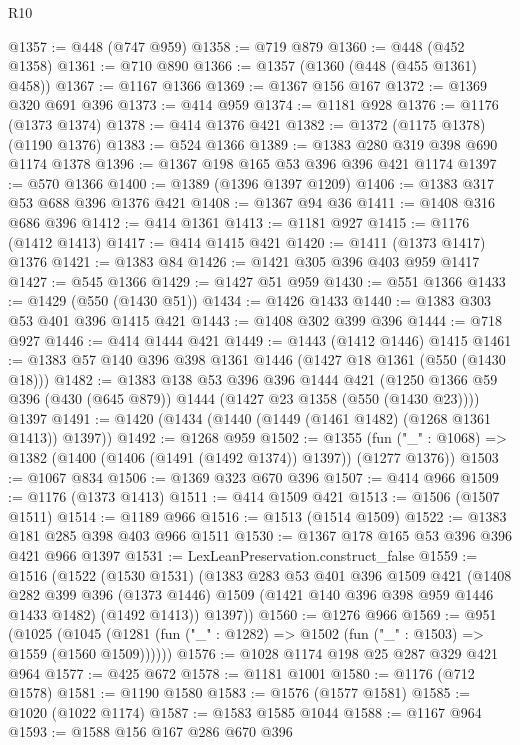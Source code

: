 \begin{lexlean}{R10}
\begin{coremodule}
@1357 := @448 (@747 @959)
@1358 := @719 @879
@1360 := @448 (@452 @1358)
@1361 := @710 @890
@1366 := @1357 (@1360 (@448 (@455 @1361) @458))
@1367 := @1167 @1366
@1369 := @1367 @156 @167
@1372 := @1369 @320 @691 @396
@1373 := @414 @959
@1374 := @1181 @928
@1376 := @1176 (@1373 @1374)
@1378 := @414 @1376 @421
@1382 := @1372 (@1175 @1378) (@1190 @1376)
@1383 := @524 @1366
@1389 := @1383 @280 @319 @398 @690 @1174 @1378
@1396 := @1367 @198 @165 @53 @396 @396 @421 @1174
@1397 := @570 @1366
@1400 := @1389 (@1396 @1397 @1209)
@1406 := @1383 @317 @53 @688 @396 @1376 @421
@1408 := @1367 @94 @36
@1411 := @1408 @316 @686 @396
@1412 := @414 @1361
@1413 := @1181 @927
@1415 := @1176 (@1412 @1413)
@1417 := @414 @1415 @421
@1420 := @1411 (@1373 @1417) @1376
@1421 := @1383 @84
@1426 := @1421 @305 @396 @403 @959 @1417
@1427 := @545 @1366
@1429 := @1427 @51 @959
@1430 := @551 @1366
@1433 := @1429 (@550 (@1430 @51))
@1434 := @1426 @1433
@1440 := @1383 @303 @53 @401 @396 @1415 @421
@1443 := @1408 @302 @399 @396
@1444 := @718 @927
@1446 := @414 @1444 @421
@1449 := @1443 (@1412 @1446) @1415
@1461 := @1383 @57 @140 @396 @398 @1361 @1446 (@1427 @18 @1361 (@550 (@1430 @18)))
@1482 := @1383
    @138
    @53
    @396
    @396
    @1444
    @421
    (@1250 @1366 @59 @396 (@430 (@645 @879)) @1444 (@1427 @23 @1358 (@550 (@1430 @23))))
    @1397
@1491 := @1420 (@1434 (@1440 (@1449 (@1461 @1482) (@1268 @1361 @1413)) @1397))
@1492 := @1268 @959
@1502 := @1355
    (fun ("_" : @1068) => @1382 (@1400 (@1406 (@1491 (@1492 @1374)) @1397)) (@1277 @1376))
@1503 := @1067 @834
@1506 := @1369 @323 @670 @396
@1507 := @414 @966
@1509 := @1176 (@1373 @1413)
@1511 := @414 @1509 @421
@1513 := @1506 (@1507 @1511)
@1514 := @1189 @966
@1516 := @1513 (@1514 @1509)
@1522 := @1383 @181 @285 @398 @403 @966 @1511
@1530 := @1367 @178 @165 @53 @396 @396 @421 @966 @1397
@1531 := LexLeanPreservation.construct_false
@1559 := @1516
    (@1522
      (@1530 @1531)
      (@1383
        @283
        @53
        @401
        @396
        @1509
        @421
        (@1408
          @282
          @399
          @396
          (@1373 @1446)
          @1509
          (@1421 @140 @396 @398 @959 @1446 @1433 @1482)
          (@1492 @1413))
        @1397))
@1560 := @1276 @966
@1569 := @951
    (@1025 (@1045 (@1281 (fun ("_" : @1282) => @1502 (fun ("_" : @1503) => @1559 (@1560 @1509))))))
@1576 := @1028 @1174 @198 @25 @287 @329 @421 @964
@1577 := @425 @672
@1578 := @1181 @1001
@1580 := @1176 (@712 @1578)
@1581 := @1190 @1580
@1583 := @1576 (@1577 @1581)
@1585 := @1020 (@1022 @1174)
@1587 := @1583 @1585 @1044
@1588 := @1167 @964
@1593 := @1588 @156 @167 @286 @670 @396

\end{coremodule}
\end{lexlean}
